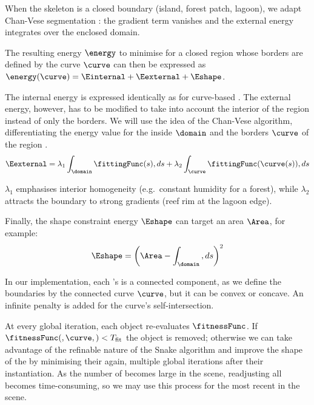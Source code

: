 When the skeleton is a closed boundary (island, forest patch, lagoon), we adapt Chan-Vese segmentation \cite{Chan2001}: the gradient term vanishes and the external energy integrates over the enclosed domain.

The resulting energy $\energy$ to minimise for a closed region whose borders are defined by the curve $\curve$ can then be expressed as $\energy(\curve) = \Einternal + \Eexternal + \Eshape$.

The internal energy is expressed identically as for curve-based . The external energy, however, has to be modified to take into account the interior of the region instead of only the borders. We will use the idea of the Chan-Vese algorithm, differentiating the energy value for the inside $\domain$ and the borders $\curve$ of the region \cite{Chan2001, Getreuer2012}.
\begin{align}
\Eexternal = \lambda_1 \int_{\domain}{ \fittingFunc(s) , ds } + \lambda_2 \int_{\curve}{ \fittingFunc(\curve(s)) , ds }
\end{align}

$\lambda_1$ emphasises interior homogeneity (e.g.\ constant humidity for a forest), while $\lambda_2$ attracts the boundary to strong gradients (reef rim at the lagoon edge).

Finally, the shape constraint energy $\Eshape$ can target an area $\Area$, for example:
\begin{align}
\Eshape = \left( \Area - \int_{\domain}{ , ds } \right)^2
\end{align}

In our implementation, each 's  is a connected component, as we define the boundaries by the connected curve $\curve$, but it can be convex or concave. An infinite penalty is added for the curve's self-intersection.

At every global iteration, each object re-evaluates $\fitnessFunc$. If $\fitnessFunc(,\curve,)<T_{\mathrm{fit}}$ the object is removed; otherwise we can take advantage of the refinable nature of the Snake algorithm and improve the shape of the  by minimising their  again, multiple global iterations after their instantiation. As the number of  becomes large in the scene, readjusting all  becomes time-consuming, so we may use this process for the most recent  in the scene.


